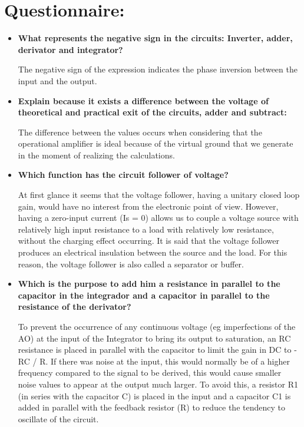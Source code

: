 \section{Questionnaire:}

\begin{itemize} 
\item {\bfseries What represents the negative sign in the circuits: Inverter, adder, derivator and integrator?} \hfill \break

The negative sign of the expression indicates the phase inversion between the input and the output. \hfill \break

\item {\bfseries Explain because it exists a difference between the voltage of theoretical and practical exit of the circuits, adder and subtract:} \hfill \break

The difference between the values occurs when considering that the operational amplifier is ideal because of the virtual ground that we generate in the moment of realizing the calculations. \hfill \break

\item {\bfseries Which function has the circuit follower of voltage?} \hfill \break

At first glance it seems that the voltage follower, having a unitary closed loop gain, would have no interest from the electronic point of view. However, having a zero-input current (Is = 0) allows us to couple a voltage source with relatively high input resistance to a load with relatively low resistance, without the charging effect occurring. It is said that the voltage follower produces an electrical insulation between the source and the load. For this reason, the voltage follower is also called a separator or buffer. \hfill \break

\item {\bfseries Which is the purpose to add him a resistance in parallel to the capacitor in the integrador and a capacitor in parallel to the resistance of the derivator?} \hfill \break

\begin{tasks}
\task To prevent the occurrence of any continuous voltage (eg imperfections of the AO) at the input of the Integrator to bring its output to saturation, an RC resistance is placed in parallel with the capacitor to limit the gain in DC to -RC / R. \hfill \break 
\task If there was noise at the input, this would normally be of a higher frequency compared to the signal to be derived, this would cause smaller noise values ​​to appear at the output much larger. To avoid this, a resistor R1 (in series with the capacitor C) is placed in the input and a capacitor C1 is added in parallel with the feedback resistor (R) to reduce the tendency to oscillate of the circuit.
\end{tasks}
\end{itemize}

\pagebreak
